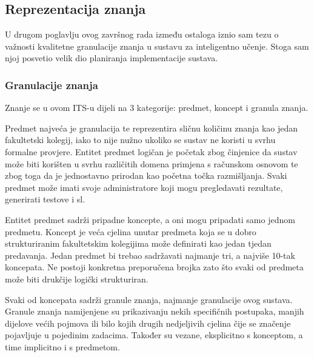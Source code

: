 \documentclass[times, utf8, zavrsni, numeric]{fer}
\begin{document}
\subsection{Reprezentacija znanja}
U drugom poglavlju ovog završnog rada između ostaloga iznio sam tezu o važnosti kvalitetne granulacije znanja u sustavu za inteligentno učenje. Stoga sam njoj posvetio velik dio planiranja implementacije sustava. 

\subsubsection{Granulacije znanja}
Znanje se u ovom ITS-u dijeli na 3 kategorije: predmet, koncept i granula znanja.
\par 
Predmet najveća je granulacija te reprezentira sličnu količinu znanja kao jedan fakultetski kolegij, iako to nije nužno ukoliko se sustav ne koristi u svrhu formalne provjere. Entitet predmet logičan je početak zbog činjenice da sustav može biti korišten u svrhu različitih domena primjena s računskom osnovom te zbog toga da je jednostavno prirodan kao početna točka razmišljanja. Svaki predmet može imati svoje administratore koji mogu pregledavati rezultate, generirati testove i sl.
\par
Entitet predmet sadrži pripadne koncepte, a oni mogu pripadati samo jednom predmetu. Koncept je veća cjelina unutar predmeta koja se u dobro strukturiranim fakultetskim kolegijima može definirati kao jedan tjedan predavanja. Jedan predmet bi trebao sadržavati najmanje tri, a najviše 10-tak koncepata. Ne postoji konkretna preporučena brojka zato što svaki od predmeta može biti drukčije logički strukturiran.
\par
Svaki od koncepata sadrži granule znanja, najmanje granulacije ovog sustava. Granule znanja namijenjene su prikazivanju nekih specifičnih postupaka, manjih dijelove većih pojmova ili bilo kojih drugih nedjeljivih cjelina čije se značenje pojavljuje u pojedinim zadacima. Također su vezane, eksplicitno s konceptom, a time implicitno i s predmetom.
\end{document}
